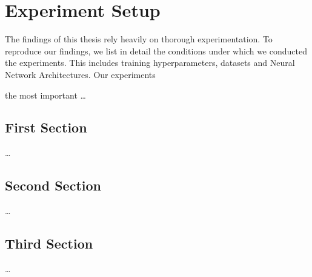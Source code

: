 
\chapter{Experiment Setup}
\label{ch:ExperimentSetup}

The findings of this thesis rely heavily on thorough experimentation. To reproduce our findings, we list in detail the
conditions under which we conducted the experiments. This includes training hyperparameters, datasets and Neural Network Architectures.
Our experiments 

the most important
\dots

\section{First Section}
\label{sec:Analysis:FirstSection}

\dots

\section{Second Section}
\label{sec:Methodology:SecondSection}

\dots

\section{Third Section}
\label{sec:Methodology:ThirdSection}

\dots
